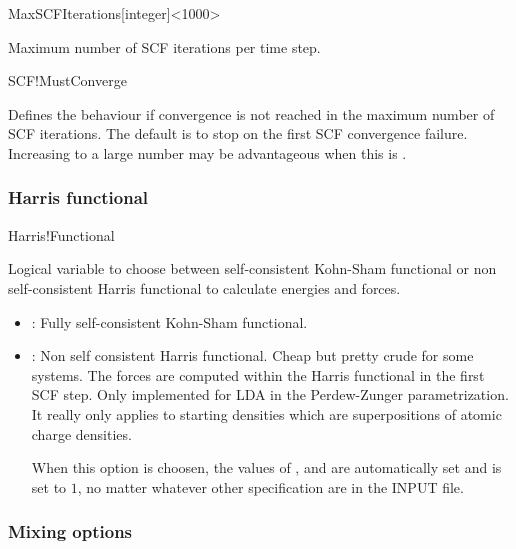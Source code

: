\begin{fdfentry}{MaxSCFIterations}[integer]<1000>

  Maximum number of SCF iterations per time step. 
  
\end{fdfentry}

\begin{fdflogicalT}{SCF!MustConverge}

  Defines the behaviour if convergence is not reached in the maximum
  number of SCF iterations. The default is to stop on the first SCF
  convergence failure. Increasing  to a large
  number may be advantageous when this is \fdftrue.
  
\end{fdflogicalT}

\subsubsection{Harris functional}

\begin{fdflogicalF}{Harris!Functional}
  
  Logical variable to choose between self-consistent Kohn-Sham
  functional or non self-consistent Harris functional to calculate
  energies and forces.
  \begin{itemize}
    \item \fdffalse: Fully self-consistent Kohn-Sham functional.
    \item \fdftrue: Non self consistent Harris functional. Cheap but
    pretty crude for some systems. The forces are computed within the
    Harris functional in the first SCF step. Only implemented for LDA in
    the Perdew-Zunger parametrization. It really only applies to starting
    densities which are superpositions of atomic charge densities.

    When this option is choosen, the values of ,
     and  are automatically
    set \fdffalse and  is set to $1$, no matter
    whatever other specification are in the INPUT file.
  \end{itemize}

\end{fdflogicalF}


\subsubsection{Mixing options}
\label{sec:scf:mix}


